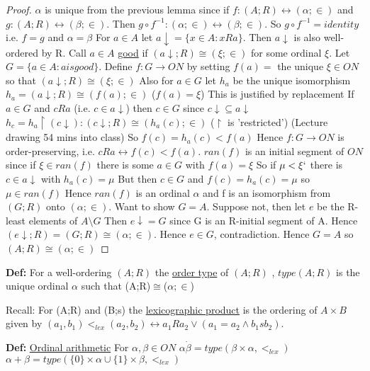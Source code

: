 \documentclass{article}
\begin{document}
    \begin{proof}
        $\alpha$ is unique from the previous lemma since if $f : (A;R) \leftrightarrow (\alpha;\in)$ and $g : (A;R) \leftrightarrow (\beta;\in)$.
        Then $g \circ f^{-1} : (\alpha;\in) \leftrightarrow (\beta;\in)$.
        So $g \circ f^{-1} = identity$ i.e. $f=g$ and $\alpha = \beta$
        For $a \in A$ let $a \downarrow = \{x\in A : x R a\}$.
        Then $a \downarrow$ is also well-ordered by R.
        Call $a \in A$ \underline{good} if $(a \downarrow;R) \cong (\xi; \in)$ for some ordinal $\xi$.
        Let $G = \{a \in A : a is good\}$.
        Define $f : G \rightarrow ON$ by setting $f(a) = $ the unique $\xi \in ON$ so that $(a\downarrow;R)\cong(\xi;\in)$
        Also for $a \in G$ let $h_a$ be the unique isomorphism $h_a=(a\downarrow;R)\cong(f(a);\in)$ ($f(a)=\xi$)
        This is justified by replacement
        If $a\in G$ and $c R a$ (i.e. $c \in a\downarrow$) then $c \in G$ since $c \downarrow \subseteq a\downarrow$
        $h_c = h_a \upharpoonright (c\downarrow): (c\downarrow;R)\cong(h_a(c);\in)$
        ($\upharpoonright$ is 'restricted')
        (Lecture drawing 54 mins into class)
        So $f(c) = h_a(c) < f(a)$
        Hence $f : G \rightarrow ON$ is order-preserving, i.e. $cRa \leftrightarrow f(c) < f(a)$.
        $ran(f)$ is an initial segment of $ON$ since if $\xi \in  ran(f)$ there is some $a \in G$ with $f(a) = \xi$
        So if $\mu < \xi`$ there is $c \in a\downarrow$ with $h_a(c) = \mu$
        But then $c \in G$ and $f(c) = h_a(c) = \mu$ so $\mu \in ran(f)$
        Hence $ran(f)$ is an ordinal $\alpha$ and f is an isomorphism from $(G;R)$ onto $(\alpha;\in)$.
        Want to show $G=A$.
        Suppose not, then let $e$ be the R-least elements of $A \setminus G$
        Then $e \downarrow = G$ since G is an R-initial segment of A.
        Hence $(e \downarrow;R) = (G;R) \cong (\alpha;\in)$.
        Hence $e \in G$, contradiction.
        Hence $G=A$ so $(A;R)\cong(\alpha;\in)$
    \end{proof}

    \textbf{Def: } For a well-ordering $(A;R)$ the \underline{order type} of $(A;R)$ , $type(A;R)$ is the unique ordinal $\alpha$ such that (A;R)$\cong$($\alpha;\in$)

    Recall: For (A;R) and (B;s) the \underline{lexicographic product} is the ordering of $A \times B$ given by $(a_1,b_1) <_{lex}(a_2,b_2) \leftrightarrow a_1 R a_2 \vee (a_1 = a_2 \wedge b_1 s b_2)$.

    \textbf{Def: } \underline{Ordinal arithmetic}
    For $\alpha,\beta \in ON$
    $\alpha \dot \beta = type(\beta \times \alpha, <_{lex})$
    $\alpha + \beta = type(\{0\}\times \alpha \cup \{1\} \times \beta, <_{lex})$
\end{document}
